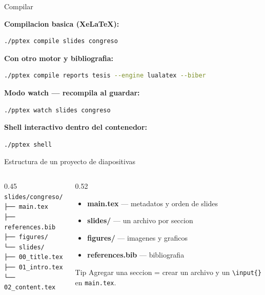 \begin{frame}[fragile]{Compilar}

  \textbf{Compilacion basica (XeLaTeX):}
  \begin{lstlisting}[language=bash]
./pptex compile slides congreso
  \end{lstlisting}

  \textbf{Con otro motor y bibliografia:}
  \begin{lstlisting}[language=bash]
./pptex compile reports tesis --engine lualatex --biber
  \end{lstlisting}

  \textbf{Modo watch — recompila al guardar:}
  \begin{lstlisting}[language=bash]
./pptex watch slides congreso
  \end{lstlisting}

  \textbf{Shell interactivo dentro del contenedor:}
  \begin{lstlisting}[language=bash]
./pptex shell
  \end{lstlisting}
\end{frame}

\begin{frame}{Estructura de un proyecto de diapositivas}
  \begin{columns}[T]
    \begin{column}{0.45\textwidth}
      \footnotesize
      \texttt{slides/congreso/}\\
      \texttt{├── main.tex}\\
      \texttt{├── references.bib}\\
      \texttt{├── figures/}\\
      \texttt{└── slides/}\\
      \texttt{\phantom{└── }├── 00\_title.tex}\\
      \texttt{\phantom{└── }├── 01\_intro.tex}\\
      \texttt{\phantom{└── }└── 02\_content.tex}
    \end{column}
    \begin{column}{0.52\textwidth}
      \begin{itemize}
        \item \textbf{main.tex} — metadatos y orden de slides
        \item \textbf{slides/} — un archivo por seccion
        \item \textbf{figures/} — imagenes y graficos
        \item \textbf{references.bib} — bibliografia
      \end{itemize}
      \vspace{0.5em}
      \begin{block}{Tip}
        Agregar una seccion = crear un archivo y un \texttt{\textbackslash input\{\}} en \texttt{main.tex}.
      \end{block}
    \end{column}
  \end{columns}
\end{frame}

